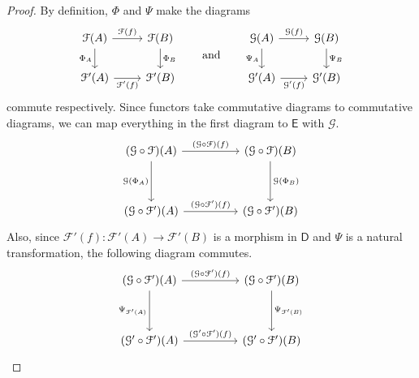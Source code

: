\documentclass[a4paper,10pt]{scrreprt}
\theoremstyle{definition}
\theoremstyle{plain}
\theoremstyle{remark}
\begin{document}
\begin{proof}
  By definition, $\Phi$ and $\Psi$ make the diagrams
  \begin{equation*}
    \begin{tikzcd}
      \mathcal{F}(A)
      \arrow[d, swap, "\Phi_{A}"] 
      \arrow[r, "\mathcal{F}(f)"] 
      & \mathcal{F}(B)
      \arrow[d, "\Phi_{B}"] 
      \\
      \mathcal{F}'(A) 
      \arrow[r, swap, "\mathcal{F}'(f)"] 
      & \mathcal{F}'(B) 
    \end{tikzcd}
    \qquad\text{and}\qquad
    \begin{tikzcd}
      \mathcal{G}(A)
      \arrow[d, swap, "\Psi_{A}"] 
      \arrow[r, "\mathcal{G}(f)"] 
      & \mathcal{G}(B)
      \arrow[d, "\Psi_{B}"] 
      \\
      \mathcal{G}'(A) 
      \arrow[r, swap, "\mathcal{G}'(f)"] 
      & \mathcal{G}'(B) 
    \end{tikzcd}
  \end{equation*}
  commute respectively. Since functors take commutative diagrams to commutative diagrams, we can map everything in the first diagram to $\mathsf{E}$ with $\mathcal{G}$.
  \begin{equation*}
    \begin{tikzcd}[row sep=huge, column sep=huge]
      (\mathcal{G} \circ \mathcal{F})(A)
      \arrow[d, swap, "\mathcal{G}(\Phi_{A})"] 
      \arrow[r, "(\mathcal{G} \circ \mathcal{F})(f)"] 
      & (\mathcal{G} \circ \mathcal{F})(B)
      \arrow[d, "\mathcal{G}(\Phi_{B})"] 
      \\
      (\mathcal{G} \circ \mathcal{F}')(A) 
      \arrow[r, "(\mathcal{G} \circ \mathcal{F}')(f)"] 
      & (\mathcal{G} \circ \mathcal{F}')(B) 
    \end{tikzcd}
  \end{equation*}
  Also, since $\mathcal{F}'(f)\colon \mathcal{F}'(A) \to \mathcal{F}'(B)$ is a morphism in $\mathsf{D}$ and $\Psi$ is a natural transformation, the following diagram commutes.
  \begin{equation*}
    \begin{tikzcd}[row sep=huge, column sep=huge]
      (\mathcal{G} \circ \mathcal{F}')(A)
      \arrow[r, "(\mathcal{G} \circ \mathcal{F}')(f)"]
      \arrow[d, swap, "\Psi_{\mathcal{F}'(A)}"]
      & (\mathcal{G} \circ \mathcal{F}')(B)
      \arrow[d, "\Psi_{\mathcal{F}'(B)}"]
      \\
      (\mathcal{G}' \circ \mathcal{F}')(A)
      \arrow[r, "(\mathcal{G}' \circ \mathcal{F}')(f)"]
      & (\mathcal{G}' \circ \mathcal{F}')(B)
    \end{tikzcd}
  \end{equation*}


\end{proof}
\end{document}
